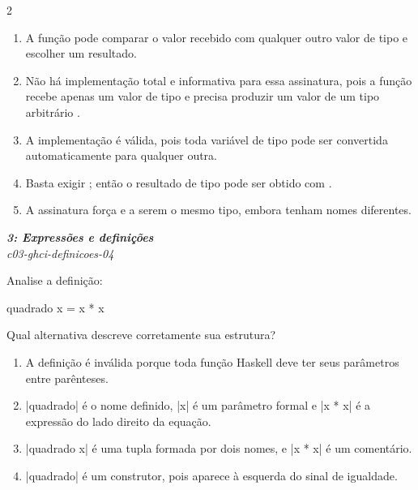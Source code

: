 \documentclass[a4paper,10pt,brazil]{article}
\begin{document}
\begin{multicols}{2}
\begin{enumerate}
  \item A função pode comparar o valor recebido com qualquer outro valor de tipo  e escolher um resultado.
  \item Não há implementação total e informativa para essa assinatura, pois a função recebe apenas um valor de tipo  e precisa produzir um valor de um tipo arbitrário .
  \item A implementação  é válida, pois toda variável de tipo pode ser convertida automaticamente para qualquer outra.
  \item Basta exigir ; então o resultado de tipo  pode ser obtido com .
  \item A assinatura força  e  a serem o mesmo tipo, embora tenham nomes diferentes.

\end{enumerate}

\begin{flushright}
  \footnotesize
  \textit{\textbf{3: Expressões e definições}}\\
  \textit{c03-ghci-definicoes-04}\\

\end{flushright}
Analise a definição:

\begin{haskellcode}
quadrado x = x * x
\end{haskellcode}

Qual alternativa descreve corretamente sua estrutura?

\begin{enumerate}
  \item A definição é inválida porque toda função Haskell deve ter seus parâmetros entre parênteses.

  \item \haskellinline|quadrado| é o nome definido, \haskellinline|x| é um parâmetro formal e \haskellinline|x * x| é a expressão do lado direito da equação.

  \item \haskellinline|quadrado x| é uma tupla formada por dois nomes, e \haskellinline|x * x| é um comentário.

  \item \haskellinline|quadrado| é um construtor, pois aparece à esquerda do sinal de igualdade.


\end{enumerate}
\end{multicols}
\end{document}
